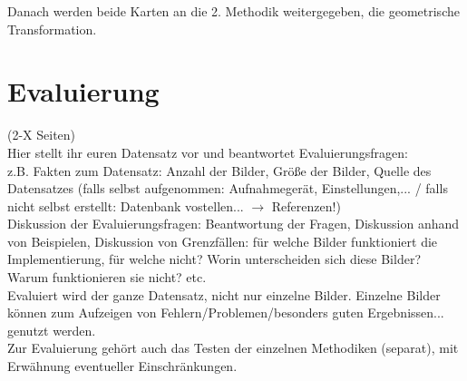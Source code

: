 \documentclass[paper=A4, deutsch]{scrartcl}
\begin{document}
Danach werden beide Karten an die 2. Methodik weitergegeben, die geometrische Transformation.


\newpage

\section{Evaluierung}
(2-X Seiten)\\
Hier stellt ihr euren Datensatz vor und beantwortet Evaluierungsfragen:\\
z.B. Fakten zum Datensatz: Anzahl der Bilder, Größe der Bilder, Quelle des Datensatzes (falls selbst aufgenommen: Aufnahmegerät, Einstellungen,... / falls nicht selbst erstellt: Datenbank vostellen... $\to$ Referenzen!)\\
Diskussion der Evaluierungsfragen: Beantwortung der Fragen, Diskussion anhand von Beispielen, Diskussion von Grenzfällen: für welche Bilder funktioniert die Implementierung, für welche nicht? Worin unterscheiden sich diese Bilder? Warum funktionieren sie nicht? etc.\\
Evaluiert wird der ganze Datensatz, nicht nur einzelne Bilder. Einzelne Bilder können zum Aufzeigen von Fehlern/Problemen/besonders guten Ergebnissen... genutzt werden.\\
Zur Evaluierung gehört auch das Testen der einzelnen Methodiken (separat), mit Erwähnung eventueller Einschränkungen.

\end{document}
